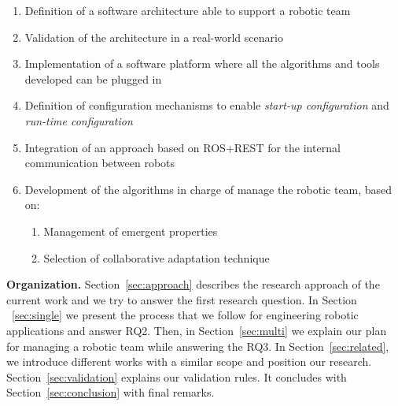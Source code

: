 \begin{enumerate}
\item Definition of a software architecture able to support a robotic team
\item Validation of the architecture in a real-world scenario
\item Implementation of a software platform where all the algorithms and tools developed can be plugged in 
\item Definition of configuration mechanisms to enable \emph{start-up configuration} and \emph{run-time configuration}
\item Integration of an approach based on ROS+REST for the internal communication between robots
\item Development of the algorithms in charge of manage the robotic team, based on:
\begin{enumerate}
\item Management of emergent properties
\item Selection of collaborative adaptation technique
\end{enumerate}
\end{enumerate}

\textbf{Organization.} 
Section~\ref{sec:approach} describes the research approach of the current work and we try to answer the first research question.
In Section ~\ref{sec:single} we present the process that we follow for engineering robotic applications and answer RQ2.
Then, in Section~\ref{sec:multi} we explain our plan for managing a robotic team while answering the RQ3.
In Section~\ref{sec:related}, we introduce different works with a similar scope and position our research.
Section~\ref{sec:validation} explains our validation rules.
It concludes with Section~\ref{sec:conclusion} with final remarks.